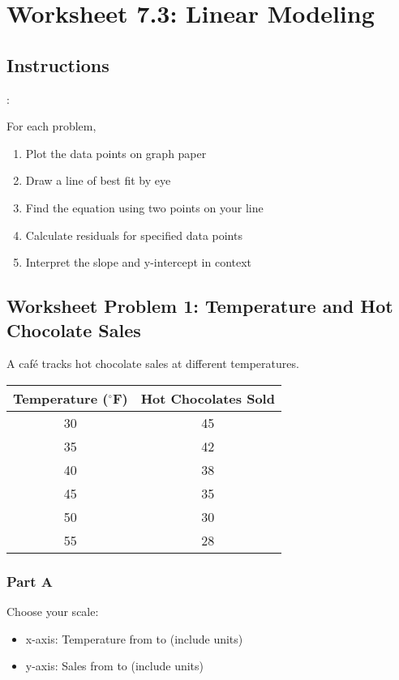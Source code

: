 \documentclass[12pt]{article}
\begin{document}
			\newpage

	\section*{Worksheet 7.3: Linear Modeling}

		\subsection*{Instructions}:
			
			For each problem,
			\begin{enumerate}
				\item Plot the data points on graph paper
				\item Draw a line of best fit by eye
				\item Find the equation using two points on your line
				\item Calculate residuals for specified data points
				\item Interpret the slope and y-intercept in context
			\end{enumerate}

			\newpage

		\subsection*{Worksheet Problem 1: Temperature and Hot Chocolate Sales}

			A café tracks hot chocolate sales at different temperatures.

			\begin{center}
				\begin{tabular}{|c|c|}
					\hline
					Temperature ($^\circ$F) & Hot Chocolates Sold \\
					\hline
					30 & 45 \\
					35 & 42 \\
					40 & 38 \\
					45 & 35 \\
					50 & 30 \\
					55 & 28 \\
					\hline
				\end{tabular}
			\end{center}

			\subsubsection*{Part A}

				Choose your scale:
				\begin{itemize}
					\item x-axis: Temperature from \underline{\hspace{1in}} to \underline{\hspace{1in}} (include units)
					\item y-axis: Sales from \underline{\hspace{1in}} to \underline{\hspace{1in}} (include units)
				\end{itemize}
\end{document}
